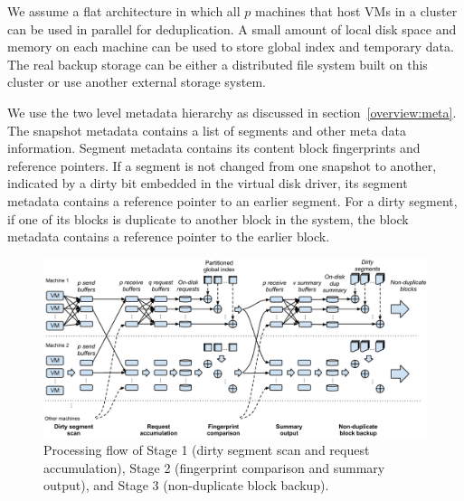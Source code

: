 We assume a flat architecture in which  all $p$ machines that host VMs in a cluster can
be used in parallel for deduplication.
A small amount of local disk space and memory on each machine can be used
to store global index and temporary data.
The real backup storage can be either a distributed file system built on
this cluster  or use another  external storage system.


We use the two level metadata hierarchy as discussed in section~\ref{overview:meta}.
The snapshot metadata  contains a list of segments and other meta data information.
Segment metadata contains its  content block fingerprints and reference pointers.
If a segment is not changed from one snapshot to another, indicated by a dirty bit embedded in the virtual disk driver,
its segment metadata contains a reference pointer to an earlier segment.
For a dirty segment, if one of its blocks is duplicate to another block in the system,
the block metadata contains a reference pointer to the earlier block.

\begin{figure}
\centering
\includegraphics[height=0.45\textwidth]{images/steps.pdf}
\caption{Processing flow of Stage  1 (dirty segment scan and request accumulation), Stage 2
(fingerprint comparison and summary output),  and Stage 3 (non-duplicate block backup).}
\label{fig:flow}
\end{figure}

